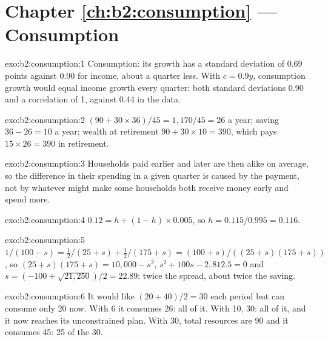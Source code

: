 \section*{Chapter \ref{ch:b2:consumption} --- Consumption}

\begin{solution}{exo:b2:consumption:1}
Consumption: its growth has a standard deviation of 0.69 points against 0.90 for income, about a quarter less. With $c = 0.9y$,
consumption growth would equal income growth every quarter: both standard deviations 0.90 and a correlation of 1, against
0.44 in the data.
\end{solution}

\begin{solution}{exo:b2:consumption:2}
$(90 + 30 \times 36)/45 = 1{,}170/45 = 26$ a year; saving $36 - 26 = 10$ a year; wealth at retirement $90 + 30 \times 10 = 390$, which pays $15 \times 26 = 390$ in retirement.
\end{solution}

\begin{solution}{exo:b2:consumption:3}
Households paid earlier and later are then alike on average, so the difference in their spending in a given quarter is
caused by the payment, not by whatever might make some households both receive money early and spend more.
\end{solution}

\begin{solution}{exo:b2:consumption:4}
$0.12 = h + (1 - h) \times 0.005$, so $h = 0.115/0.995 = 0.116$.
\end{solution}

\begin{solution}{exo:b2:consumption:5}
$1/(100 - s) = \tfrac12/(25 + s) + \tfrac12/(175 + s) = (100 + s)/((25 + s)(175 + s))$, so $(25 + s)(175 + s) = 10{,}000 - s^2$, $s^2 + 100s - 2{,}812.5 = 0$ and $s = (-100 + \sqrt{21{,}250})/2 = 22.89$:
twice the spread, about twice the saving.
\end{solution}

\begin{solution}{exo:b2:consumption:6}
It would like $(20 + 40)/2 = 30$ each period but can consume only 20 now. With 6 it consumes 26: all of it. With 10, 30: all of it, and
it now reaches its unconstrained plan. With 30, total resources are 90 and it consumes 45: 25 of the 30.
\end{solution}

